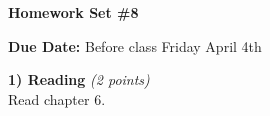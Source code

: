 

\def\xyprime{\ensuremath{\begin{pmatrix} x' \\ y' \end{pmatrix}}}



\thispagestyle{fancy}






\begin{center}
{\huge \textbf{Homework Set \#8}}
\large

{\textbf{ Due Date:} Before class Friday April 4th  }
\end{center}

\textbf{1) Reading } \hfill \textit{(2 points)}\\
Read chapter 6.

\vspace*{0.4in}

